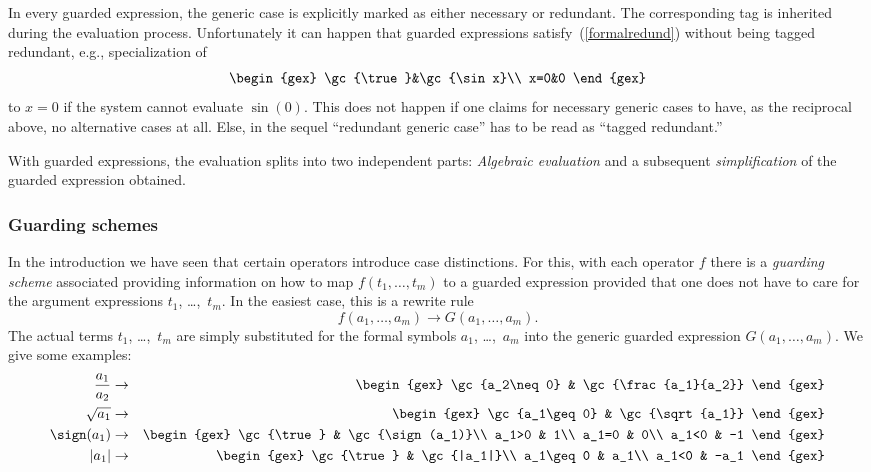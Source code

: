 In every guarded expression, the generic case is explicitly marked as
either necessary or redundant. The corresponding tag is inherited
during the evaluation process. Unfortunately it can happen that
guarded expressions satisfy~(\ref{formalredund}) without being tagged
redundant, e.g., specialization of
$$
\begin{gex}
\gc{\true}&\gc{\sin x}\\
x=0&0
\end{gex}
$$
to $x=0$ if the system cannot evaluate $\sin(0)$. This does not happen
if one claims for necessary generic cases to have, as the reciprocal
above, no alternative cases at all. Else, in the sequel ``redundant
generic case'' has to be read as ``tagged redundant.''

With guarded expressions, the evaluation splits into two independent
parts: {\em Algebraic evaluation} and a subsequent {\em
simplification} of the guarded expression obtained.
%
\subsubsection{Guarding schemes}
In the introduction we have seen that certain operators introduce case
distinctions. For this, with each operator $f$ there is a {\em
guarding scheme} associated providing information on how to map
$f(t_1,\ldots,t_m)$ to a guarded expression provided that one does not
have to care for the argument expressions $t_1$, \dots,~$t_m$. In the
easiest case, this is a rewrite rule
$$
f(a_1,\ldots,a_m)\to G(a_1,\ldots,a_m).
$$
The actual terms $t_1$, \dots,~$t_m$ are simply substituted for the
formal symbols $a_1$, \dots,~$a_m$ into the generic guarded expression
$G(a_1,\ldots,a_m)$. We give some examples:
\begin{eqnarray}
\frac{a_1}{a_2} & \to &
\begin{gex}
\gc{a_2\neq 0} & \gc{\frac{a_1}{a_2}}
\end{gex}\nonumber\\
\sqrt{a_1} & \to &
\begin{gex}
\gc{a_1\geq 0} & \gc{\sqrt{a_1}}
\end{gex}\nonumber\\
\sign(a_1) & \to &
\begin{gex}
\gc{\true} & \gc{\sign(a_1)}\\
a_1>0 & 1\\
a_1=0 & 0\\
a_1<0 & -1
\end{gex}\nonumber\\
|a_1| & \to &
\begin{gex}
\gc{\true} & \gc{|a_1|}\\
a_1\geq0 & a_1\\
a_1<0 & -a_1
\end{gex}\label{absrewrite}
\end{eqnarray}

